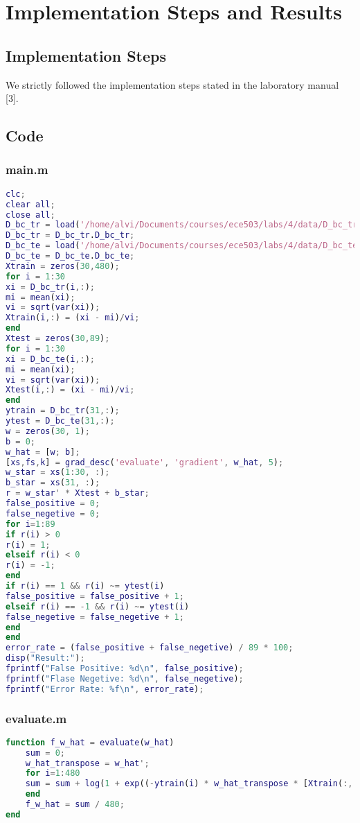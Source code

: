 \section{Implementation Steps and Results}
\label{sect:implementation-result}

\subsection{Implementation Steps}
\label{subsect:implementation_steps}
We strictly followed the implementation steps stated in the laboratory manual [3].

\subsection{Code}
\label{subsect:code}

\subsubsection{main.m}
\label{subsubsect:main}
\begin{lstlisting}[language=Matlab]
clc;
clear all;
close all;
D_bc_tr = load('/home/alvi/Documents/courses/ece503/labs/4/data/D_bc_tr.mat');
D_bc_tr = D_bc_tr.D_bc_tr;
D_bc_te = load('/home/alvi/Documents/courses/ece503/labs/4/data/D_bc_te.mat');
D_bc_te = D_bc_te.D_bc_te;
Xtrain = zeros(30,480);
for i = 1:30
xi = D_bc_tr(i,:);
mi = mean(xi);
vi = sqrt(var(xi));
Xtrain(i,:) = (xi - mi)/vi;
end
Xtest = zeros(30,89);
for i = 1:30
xi = D_bc_te(i,:);
mi = mean(xi);
vi = sqrt(var(xi));
Xtest(i,:) = (xi - mi)/vi;
end
ytrain = D_bc_tr(31,:);
ytest = D_bc_te(31,:);
w = zeros(30, 1);
b = 0;
w_hat = [w; b];
[xs,fs,k] = grad_desc('evaluate', 'gradient', w_hat, 5);
w_star = xs(1:30, :);
b_star = xs(31, :);
r = w_star' * Xtest + b_star;
false_positive = 0;
false_negetive = 0;
for i=1:89
if r(i) > 0
r(i) = 1;
elseif r(i) < 0
r(i) = -1;
end
if r(i) == 1 && r(i) ~= ytest(i)
false_positive = false_positive + 1;
elseif r(i) == -1 && r(i) ~= ytest(i)
false_negetive = false_negetive + 1;
end
end
error_rate = (false_positive + false_negetive) / 89 * 100;
disp("Result:");
fprintf("False Positive: %d\n", false_positive);
fprintf("Flase Negetive: %d\n", false_negetive);
fprintf("Error Rate: %f\n", error_rate);
\end{lstlisting}

\subsubsection{evaluate.m}
\label{subsubsect:evaluate}
\begin{lstlisting}[language=Matlab]
function f_w_hat = evaluate(w_hat)
	sum = 0;
	w_hat_transpose = w_hat';
	for i=1:480
	sum = sum + log(1 + exp((-ytrain(i) * w_hat_transpose * [Xtrain(:, i); 1])));
	end
	f_w_hat = sum / 480;
end
\end{lstlisting}

